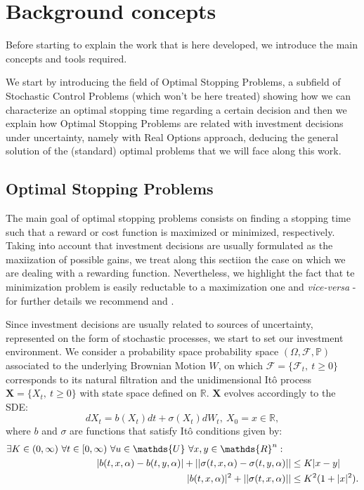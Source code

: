 \chapter{Background concepts}
\label{chapter:bc}

Before starting to explain the work that is here developed, we introduce the main concepts and tools required.

We start by introducing the field of Optimal Stopping Problems, a subfield of Stochastic Control Problems (which won't be here treated) showing how we can characterize an optimal stopping time regarding a certain decision and then we explain how Optimal Stopping Problems are related with investment decisions under uncertainty, namely with Real Options approach, deducing the general solution of the (standard) optimal problems that we will face along this work.


\section{Optimal Stopping Problems}
\label{section:osp}

The main goal of optimal stopping problems consists on finding a stopping time such that a reward or cost function is maximized or minimized, respectively. Taking into account that investment decisions are usually formulated as the maxiization of possible gains, we treat along this sectiion the case on which we are dealing with a rewarding function. Nevertheless, we highlight the fact that te minimization problem is easily reductable to a maximization one and \textit{vice-versa} - for further details we recommend \cite{ross} and \cite{oksendal:book}.

Since investment decisions are usually related to sources of uncertainty, represented on the form of stochastic processes, we start to set our investment environment. We consider a probability space probability space $(\Omega,\mathcal{F}, \mathds{P})$ associated to the underlying Brownian Motion $W$, on which $\mathcal{F}=\{\mathcal{F}_t, \ t\geq0 \}$ corresponds to its natural filtration and the unidimensional Itô process $\textbf{X}=\{ X_t, \ t \geq0 \}$ with state space defined on $\mathds{R}$. $\textbf{X}$ evolves accordingly to the SDE:
\begin{equation}
d X_t=b(X_t)dt + \sigma (X_t)dW_t, \ X_0=x\in \mathds{R},
\label{bc_sde}
\end{equation} 
where $b$ and $\sigma$ are functions that satisfy Itô conditions given by:
\begin{align}
\exists K \in (0,\infty) \  \forall t \in [0,\infty) \ \forall u \in \mathds{U} \ \forall x,y \in\mathds{R}^n: \hspace{3mm} \nonumber &\\
|b(t,x,\alpha)-b(t,y,\alpha)| + || \sigma (t,x,\alpha)- \sigma(t,y,\alpha)|| &\leq K |x-y| \label{bc_cond1} \\
|b(t,x,\alpha)|^2+|| \sigma (t,x,\alpha)|| &\leq K^2 (1+|x|^2).  \label{bc_cond2}
\end{align}

